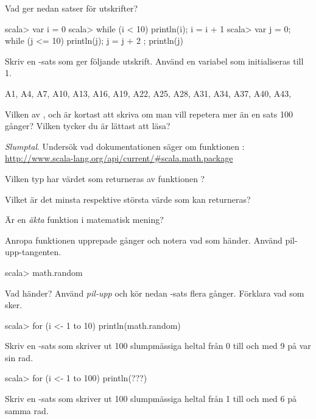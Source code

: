 {{{{\Subtask Vad ger nedan satser för utskrifter?
\begin{REPL}
scala> var i = 0
scala> while (i < 10) { println(i); i = i + 1 }
scala> var j = 0; while (j <= 10) { println(j); j = j + 2 }; println(j)
\end{REPL}

\Subtask Skriv en -sats som ger följande utskrift. Använd en variabel  som initialiseras till 1.
\begin{REPLnonum}
A1, A4, A7, A10, A13, A16, A19, A22, A25, A28, A31, A34, A37, A40, A43, 
\end{REPLnonum}

\Subtask\Pen Vilken av ,  och  är kortast att skriva om man vill repetera mer än en sats 100 gånger? Vilken tycker du är lättast att läsa? 

\Task \textit{Slumptal}. Undersök vad dokumentationen säger om funktionen :\\  %
\url{http://www.scala-lang.org/api/current/#scala.math.package} 

\Subtask\Pen Vilken typ har värdet som returneras av funktionen ? 
 
\Subtask\Pen Vilket är det minsta respektive största värde som kan returneras? 

\Subtask\Pen Är  en \textit{äkta} funktion  i matematisk mening?

\Subtask Anropa funktionen  upprepade gånger och notera vad som händer. Använd pil-upp-tangenten.
\begin{REPLnonum}
scala> math.random
\end{REPLnonum}


\Subtask Vad händer? Använd \textit{pil-upp} och kör nedan -sats flera gånger. Förklara vad som sker.

\begin{REPLnonum}
scala> for (i <- 1 to 10) println(math.random)
\end{REPLnonum}

\Subtask Skriv en -sats som skriver ut 100 slumpmässiga heltal från 0 till och med 9 på var sin rad.

\begin{REPLnonum}
scala> for (i <- 1 to 100) println(???)
\end{REPLnonum}

\Subtask Skriv en -sats som skriver ut 100 slumpmässiga heltal från 1 till och med 6 på samma rad.

}}}}
